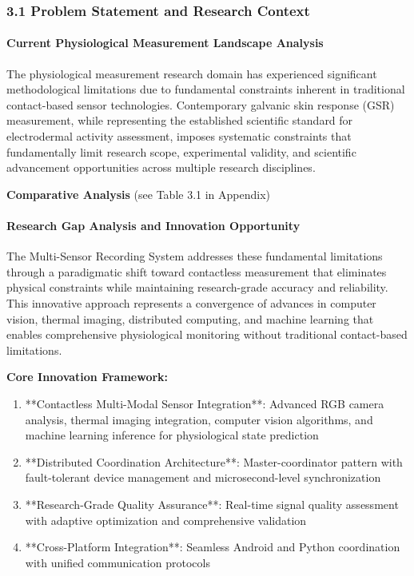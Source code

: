 \documentclass[12pt,a4paper]{report}
\begin{document}
\subsubsection{3.1 Problem Statement and Research Context}

\paragraph{Current Physiological Measurement Landscape Analysis}

The physiological measurement research domain has experienced significant methodological limitations due to fundamental
constraints inherent in traditional contact-based sensor technologies. Contemporary galvanic skin response (GSR)
measurement, while representing the established scientific standard for electrodermal activity assessment, imposes
systematic constraints that fundamentally limit research scope, experimental validity, and scientific advancement
opportunities across multiple research disciplines.

\textbf{Comparative Analysis} (see Table 3.1 in Appendix)

\paragraph{Research Gap Analysis and Innovation Opportunity}

The Multi-Sensor Recording System addresses these fundamental limitations through a paradigmatic shift toward
contactless measurement that eliminates physical constraints while maintaining research-grade accuracy and reliability.
This innovative approach represents a convergence of advances in computer vision, thermal imaging, distributed
computing, and machine learning that enables comprehensive physiological monitoring without traditional contact-based
limitations.

\textbf{Core Innovation Framework:}

\begin{enumerate}
\item **Contactless Multi-Modal Sensor Integration**: Advanced RGB camera analysis, thermal imaging integration, computer
   vision algorithms, and machine learning inference for physiological state prediction
\item **Distributed Coordination Architecture**: Master-coordinator pattern with fault-tolerant device management and
   microsecond-level synchronization
\item **Research-Grade Quality Assurance**: Real-time signal quality assessment with adaptive optimization and
   comprehensive validation
\item **Cross-Platform Integration**: Seamless Android and Python coordination with unified communication protocols

\end{enumerate}
\end{document}
